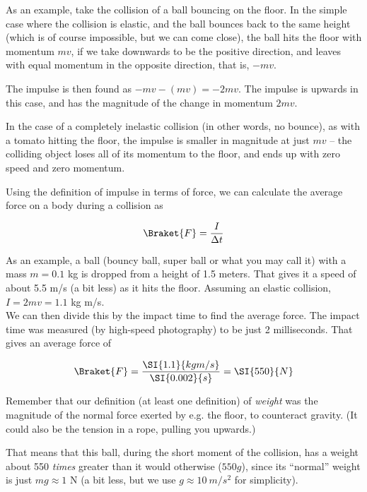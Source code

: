 As an example, take the collision of a ball bouncing on the floor. In the simple case where the collision is elastic, and the ball bounces back to the same height (which is of course impossible, but we can come close), the ball hits the floor with momentum $m v$, if we take downwards to be the positive direction, and leaves with equal momentum in the opposite direction, that is, $- m v$.

The impulse is then found as $- mv - (mv) = - 2 m v$. The impulse is upwards in this case, and has the magnitude of the change in momentum $2 m v$.

In the case of a completely inelastic collision (in other words, no bounce), as with a tomato hitting the floor, the impulse is smaller in magnitude at just $m v$ -- the colliding object loses all of its momentum to the floor, and ends up with zero speed and zero momentum.

Using the definition of impulse in terms of force, we can calculate the average force on a body during a collision as

\begin{equation}
\Braket{F} = \frac{I}{\Delta t}
\end{equation}

As an example, a ball (bouncy ball, super ball or what you may call it) with a mass $m = 0.1$ kg is dropped from a height of 1.5 meters. That gives it a speed of about 5.5 m/s (a bit less) as it hits the floor. Assuming an elastic collision, $I = 2 m v = 1.1$ kg m/s.\\
We can then divide this by the impact time to find the average force. The impact time was measured (by high-speed photography) to be just 2 milliseconds. That gives an average force of

\begin{equation}
\Braket{F} = \frac{\SI{1.1}{kg m/s}}{\SI{0.002}{s}} = \SI{550}{N}
\end{equation}

Remember that our definition (at least one definition) of \emph{weight} was the magnitude of the normal force exerted by e.g. the floor, to counteract gravity. (It could also be the tension in a rope, pulling you upwards.)

That means that this ball, during the short moment of the collision, has a weight about 550 \emph{times} greater than it would otherwise ($550 g$), since its ``normal'' weight is just $m g \approx 1$ N (a bit less, but we use $g \approx \SI{10}{m/s^2}$ for simplicity).

